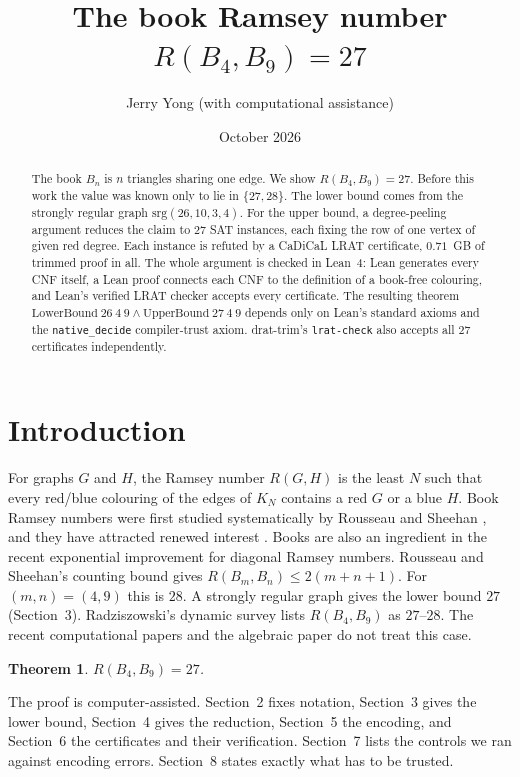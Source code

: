 \documentclass[11pt]{amsart}
\title[$R(B_4,B_9)=27$]{The book Ramsey number $R(B_4,B_9)=27$}
\author{Jerry Yong (with computational assistance)}
\date{October 2026}
\newtheorem{theorem}{Theorem}[section]
\theoremstyle{definition}
\begin{document}
\begin{abstract}
The book $B_n$ is $n$ triangles sharing one edge. We show
$R(B_4,B_9)=27$. Before this work the value was known only to lie in
$\{27,28\}$. The lower bound comes from the strongly regular graph
$\mathrm{srg}(26,10,3,4)$. For the upper bound, a degree-peeling
argument reduces the claim to $27$ SAT instances, each fixing the row
of one vertex of given red degree. Each instance is refuted by a
CaDiCaL LRAT certificate, $0.71$~GB of trimmed proof in all. The
whole argument is checked in Lean~4: Lean generates every CNF itself,
a Lean proof connects each CNF to the definition of a book-free
colouring, and Lean's verified LRAT checker accepts every certificate.
The resulting theorem
$\mathrm{LowerBound}\ 26\ 4\ 9 \wedge \mathrm{UpperBound}\ 27\ 4\ 9$
depends only on Lean's standard axioms and the \texttt{native\_decide}
compiler-trust axiom. drat-trim's \texttt{lrat-check} also accepts all
$27$ certificates independently.
\end{abstract}

\maketitle

\section{Introduction}

For graphs $G$ and $H$, the Ramsey number $R(G,H)$ is the least $N$
such that every red/blue colouring of the edges of $K_N$ contains a
red $G$ or a blue $H$. Book Ramsey numbers were first studied
systematically by Rousseau and Sheehan \cite{RS78}, and they have
attracted renewed interest
\cite{CFW21,Wes24,LMPV24,DL26}. Books are also an ingredient in the
recent exponential improvement for diagonal Ramsey numbers. Rousseau
and Sheehan's counting bound gives $R(B_m,B_n)\le 2(m+n+1)$. For
$(m,n)=(4,9)$ this is $28$. A strongly regular graph gives the lower
bound $27$ (Section~3). Radziszowski's dynamic survey
\cite[Table~IXa]{Rad} lists $R(B_4,B_9)$ as $27$--$28$. The recent
computational papers \cite{LMPV24,Wes24} and the algebraic paper
\cite{DL26} do not treat this case.

\begin{theorem}\label{thm:main}
$R(B_4,B_9)=27$.
\end{theorem}

The proof is computer-assisted. Section~2 fixes notation, Section~3
gives the lower bound, Section~4 gives the reduction, Section~5 the
encoding, and Section~6 the certificates and their verification.
Section~7 lists the controls we ran against encoding errors.
Section~8 states exactly what has to be trusted.
\end{document}
